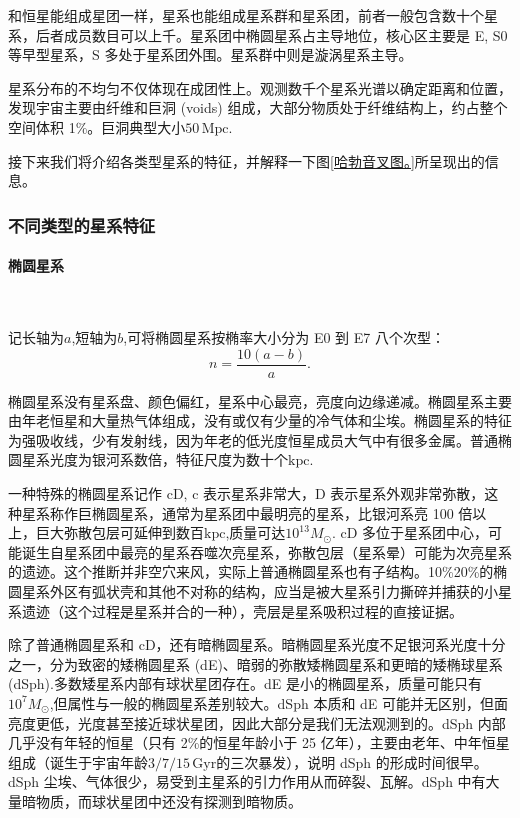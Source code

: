 \documentclass[../天体物理基础.tex]{subfiles}
\begin{document}
和恒星能组成星团一样，星系也能组成星系群和星系团，前者一般包含数十个星系，后者成员数目可以上千。星系团中椭圆星系占主导地位，核心区主要是 E, S0 等早型星系，S 多处于星系团外围。星系群中则是漩涡星系主导。

星系分布的不均匀不仅体现在成团性上。观测数千个星系光谱以确定距离和位置，发现宇宙主要由纤维和巨洞 (voids) 组成，大部分物质处于纤维结构上，约占整个空间体积 1\%。巨洞典型大小$50\,\mathrm{Mpc}$.

接下来我们将介绍各类型星系的特征，并解释一下图\ref{哈勃音叉图。}所呈现出的信息。

\subsubsection{不同类型的星系特征}

\paragraph{椭圆星系}~{}

记长轴为$a$,短轴为$b$,可将椭圆星系按椭率大小分为 E0 到 E7 八个次型：
\begin{equation}
n=\frac{10\left(a-b\right)}{a}.
\end{equation}

椭圆星系没有星系盘、颜色偏红，星系中心最亮，亮度向边缘递减。椭圆星系主要由年老恒星和大量热气体组成，没有或仅有少量的冷气体和尘埃。椭圆星系的特征为强吸收线，少有发射线，因为年老的低光度恒星成员大气中有很多金属。普通椭圆星系光度为银河系数倍，特征尺度为数十个$\mathrm{kpc}$.

一种特殊的椭圆星系记作 cD, c 表示星系非常大，D 表示星系外观非常弥散，这种星系称作巨椭圆星系，通常为星系团中最明亮的星系，比银河系亮 100 倍以上，巨大弥散包层可延伸到数百$\mathrm{kpc}$,质量可达$10^{13}M_{\odot}$. cD 多位于星系团中心，可能诞生自星系团中最亮的星系吞噬次亮星系，弥散包层（星系晕）可能为次亮星系的遗迹。这个推断并非空穴来风，实际上普通椭圆星系也有子结构。10\%\text{\textendash}20\%的椭圆星系外区有弧状壳和其他不对称的结构，应当是被大星系引力撕碎并捕获的小星系遗迹（这个过程是星系并合的一种），壳层是星系吸积过程的直接证据。

除了普通椭圆星系和 cD，还有暗椭圆星系。暗椭圆星系光度不足银河系光度十分之一，分为致密的矮椭圆星系 (dE)、暗弱的弥散矮椭圆星系和更暗的矮椭球星系 (dSph).多数矮星系内部有球状星团存在。dE 是小的椭圆星系，质量可能只有$10^{7}M_{\odot}$,但属性与一般的椭圆星系差别较大。dSph 本质和 dE 可能并无区别，但面亮度更低，光度甚至接近球状星团，因此大部分是我们无法观测到的。dSph 内部几乎没有年轻的恒星（只有 2\%的恒星年龄小于 25 亿年），主要由老年、中年恒星组成（诞生于宇宙年龄$3/7/15\,\mathrm{Gyr}$的三次暴发），说明 dSph 的形成时间很早。dSph 尘埃、气体很少，易受到主星系的引力作用从而碎裂、瓦解。dSph 中有大量暗物质，而球状星团中还没有探测到暗物质。
\end{document}
